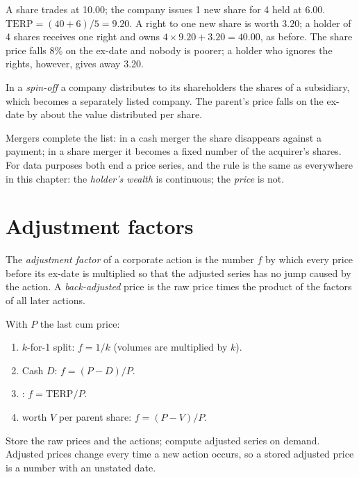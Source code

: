 \begin{example}\label{ex:m1:shares-corporate-actions-indices:terp}
A share trades at 10.00; the company issues 1 new share for 4 held at 6.00.
$\mathrm{TERP} = (40 + 6)/5 = 9.20$. A right to one new share is worth
$3.20$; a holder of 4 shares receives one right and owns $4 \times 9.20 +
3.20 = 40.00$, as before. The share price falls 8\% on the ex-date and
nobody is poorer; a holder who ignores the rights, however, gives away 3.20.
\end{example}

\begin{definition}\label{def:m1:shares-corporate-actions-indices:spinoff}
In a \emph{spin-off} a company distributes to its
shareholders the shares of a subsidiary, which becomes a separately listed
company. The parent's price falls on the ex-date by about the value
distributed per share.
\end{definition}

Mergers complete the list: in a cash merger the share disappears against a
payment; in a share merger it becomes a fixed number of the acquirer's
shares. For data purposes both end a price series, and the rule is the same
as everywhere in this chapter: the \emph{holder's wealth} is continuous; the
\emph{price} is not.

\section{Adjustment factors}

\begin{definition}\label{def:m1:shares-corporate-actions-indices:factor}
The \emph{adjustment factor} of a corporate action
is the number $f$ by which every price before its ex-date is multiplied so
that the adjusted series has no jump caused by the action. A
\emph{back-adjusted} price is the raw price times the product of the factors
of all later actions.
\end{definition}

\begin{method}\label{met:m1:shares-corporate-actions-indices:factors}
With $P$ the last cum price:
\begin{enumerate}
\item $k$-for-1 split: $f = 1/k$ (volumes are multiplied by $k$).
\item Cash  $D$: $f = (P-D)/P$.
\item {}: $f = \mathrm{TERP}/P$.
\item {} worth $V$ per parent share: $f = (P-V)/P$.
\end{enumerate}
Store the raw prices and the actions; compute adjusted series on demand.
Adjusted prices change every time a new action occurs, so a stored adjusted
price is a number with an unstated date.
\end{method}

